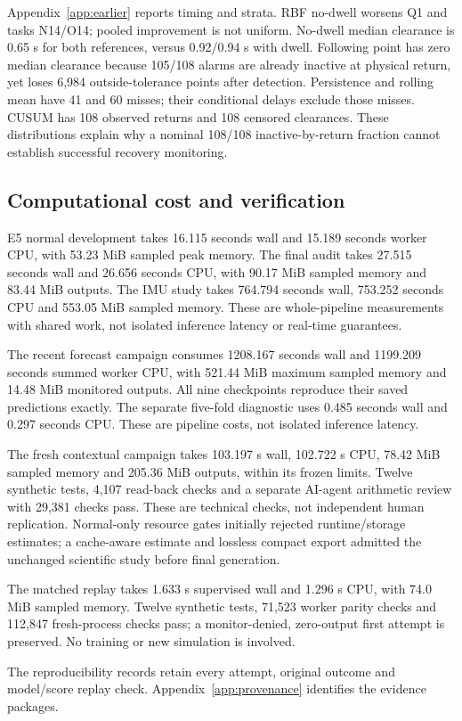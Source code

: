 Appendix~\ref{app:earlier} reports timing and strata. RBF no-dwell worsens Q1 and tasks N14/O14; pooled improvement is not uniform. No-dwell median clearance is 0.65 s for both references, versus 0.92/0.94 s with dwell. Following point has zero median clearance because 105/108 alarms are already inactive at physical return, yet loses 6,984 outside-tolerance points after detection. Persistence and rolling mean have 41 and 60 misses; their conditional delays exclude those misses. CUSUM has 108 observed returns and 108 censored clearances. These distributions explain why a nominal 108/108 inactive-by-return fraction cannot establish successful recovery monitoring.



\subsection{Computational cost and verification}
E5 normal development takes 16.115 seconds wall and 15.189 seconds worker CPU, with 53.23 MiB sampled peak memory. The final audit takes 27.515 seconds wall and 26.656 seconds CPU, with 90.17 MiB sampled memory and 83.44 MiB outputs. The IMU study takes 764.794 seconds wall, 753.252 seconds CPU and 553.05 MiB sampled memory. These are whole-pipeline measurements with shared work, not isolated inference latency or real-time guarantees.

The recent forecast campaign consumes 1208.167 seconds wall and 1199.209 seconds summed worker CPU, with 521.44 MiB maximum sampled memory and 14.48 MiB monitored outputs. All nine checkpoints reproduce their saved predictions exactly. The separate five-fold diagnostic uses 0.485 seconds wall and 0.297 seconds CPU. These are pipeline costs, not isolated inference latency.

The fresh contextual campaign takes 103.197 s wall, 102.722 s CPU, 78.42 MiB sampled memory and 205.36 MiB outputs, within its frozen limits. Twelve synthetic tests, 4,107 read-back checks and a separate AI-agent arithmetic review with 29,381 checks pass. These are technical checks, not independent human replication. Normal-only resource gates initially rejected runtime/storage estimates; a cache-aware estimate and lossless compact export admitted the unchanged scientific study before final generation.

The matched replay takes 1.633 s supervised wall and 1.296 s CPU, with 74.0 MiB sampled memory. Twelve synthetic tests, 71,523 worker parity checks and 112,847 fresh-process checks pass; a monitor-denied, zero-output first attempt is preserved. No training or new simulation is involved.

The reproducibility records retain every attempt, original outcome and model/score replay check. Appendix~\ref{app:provenance} identifies the evidence packages.
